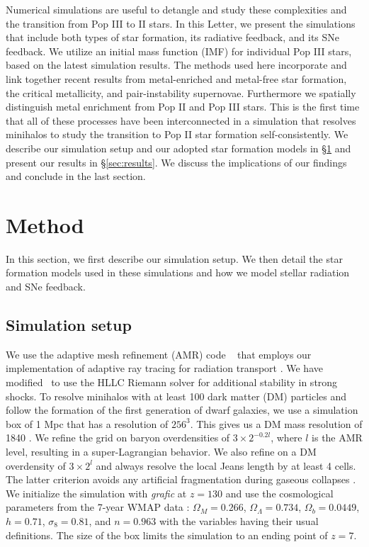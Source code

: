 \documentclass[apjl]{emulateapj}
\begin{document}
Numerical simulations are useful to detangle and study these
complexities and the transition from Pop III to II stars.  In this
Letter, we present the simulations that include both types of star
formation, its radiative feedback, and its SNe feedback.  We utilize
an initial mass function (IMF) for individual Pop III stars, based on
the latest simulation results.  The methods used here incorporate and
link together recent results from metal-enriched and metal-free star
formation, the critical metallicity, and pair-instability supernovae.
Furthermore we spatially distinguish metal enrichment from Pop II and
Pop III stars.  This is the first time that all of these processes
have been interconnected in a simulation that resolves minihalos to
study the transition to Pop II star formation self-consistently.  We
describe our simulation setup and our adopted star formation models in
\S \ref{sec:setup} and present our results in \S \ref{sec:results}.
We discuss the implications of our findings and conclude in the last
section.

\section{Method}
\label{sec:setup}

In this section, we first describe our simulation setup.  We then
detail the star formation models used in these simulations and how we
model stellar radiation and SNe feedback.

\subsection{Simulation setup}

We use the adaptive mesh refinement (AMR) code
\enzo~\citep{BryanNorman1997, OShea2004} that employs our
implementation of adaptive ray tracing for radiation transport
\citep{Wise10}.  We have modified \enzo~to use the HLLC Riemann solver
\citep{Toro94_HLLC} for additional stability in strong shocks.  To
resolve minihalos with at least 100 dark matter (DM) particles and
follow the formation of the first generation of dwarf galaxies, we use
a simulation box of 1 Mpc that has a resolution of $256^3$.  This
gives us a DM mass resolution of 1840 \Ms.  We refine the grid on
baryon overdensities of $3 \times 2^{-0.2l}$, where $l$ is the AMR
level, resulting in a super-Lagrangian behavior.  We also refine on a
DM overdensity of $3 \times 2^l$ and always resolve the local Jeans
length by at least 4 cells.  The latter criterion avoids any
artificial fragmentation during gaseous collapses \citep{Truelove97}.
We initialize the simulation with \textsl{grafic}
\citep{Bertschinger01} at $z = 130$ and use the cosmological
parameters from the 7-year WMAP data \citep{WMAP7}: $\Omega_M =
0.266$, $\Omega_\Lambda = 0.734$, $\Omega_b = 0.0449$, $h = 0.71$,
$\sigma_8 = 0.81$, and $n = 0.963$ with the variables having their
usual definitions.  The size of the box limits the simulation to an
ending point of $z=7$.
\end{document}
